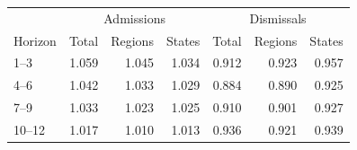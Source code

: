 \centering\small
\begin{tabular}{lrrrrrr}
\hline
 & \multicolumn{3}{c}{Admissions} & \multicolumn{3}{c}{Dismissals} \\
Horizon & Total & Regions & States & Total & Regions & States \\
\hline
1--3 & 1.059 & 1.045 & 1.034 & 0.912 & 0.923 & 0.957 \\
4--6 & 1.042 & 1.033 & 1.029 & 0.884 & 0.890 & 0.925 \\
7--9 & 1.033 & 1.023 & 1.025 & 0.910 & 0.901 & 0.927 \\
10--12 & 1.017 & 1.010 & 1.013 & 0.936 & 0.921 & 0.939 \\
\hline
\end{tabular}

